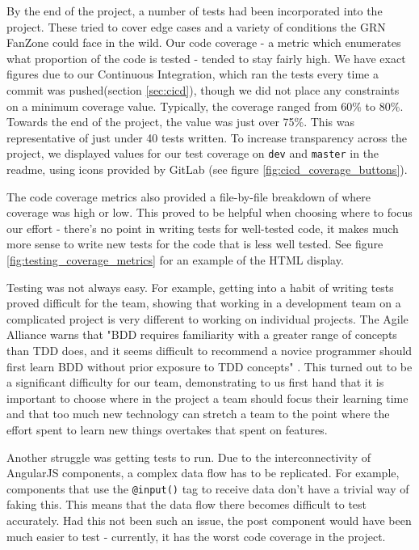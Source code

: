 \documentclass{l3proj}
\begin{document}
By the end of the project, a number of tests had been incorporated into the
 project. These tried to cover edge cases and a variety of conditions the GRN FanZone
 could face in the wild. Our code coverage - a metric which enumerates what
 proportion of the code is tested - tended to stay fairly high. We have exact
 figures due to our Continuous Integration, which ran the tests every time a
 commit was pushed(section \ref{sec:cicd}), though we did not place any constraints
 on a minimum coverage value. Typically, the coverage ranged from 60\% to 80\%.
 Towards the end of the project, the value was just over 75\%. This was
 representative of just under 40 tests written. To increase transparency
 across the project, we displayed values for our test coverage on \texttt{dev} and
 \texttt{master} in the readme, using icons provided by GitLab (see figure
 \ref{fig:cicd_coverage_buttons}).

 The code coverage metrics also provided a file-by-file breakdown of where
 coverage was high or low. This proved to be helpful when choosing
 where to focus our effort - there's no point in writing tests for
 well-tested code, it makes much more sense to write new tests for the
 code that is less well tested. See figure \ref{fig:testing_coverage_metrics}
 for an example of the HTML display.
 
Testing was not always easy. For example, getting into a habit of writing tests
 proved difficult for the team, showing that working in a development team on a
 complicated project is very different to working on individual projects. The
 Agile Alliance warns that "BDD requires familiarity with a greater range of
 concepts than TDD does, and it seems difficult to recommend a novice programmer
 should first learn BDD without prior exposure to TDD concepts"
 \cite{agilealliance_bdd}. This turned out to be a significant difficulty for
 our team, demonstrating to us first hand that it is important to choose where
 in the project a team should focus their learning time and that too much new technology
 can stretch a team to the point where the effort spent to learn new things
 overtakes that spent on features.



Another struggle was getting tests to run. Due to the interconnectivity of
 AngularJS components, a complex data flow has to be replicated. For example,
 components that use the \texttt{@input()} tag to receive data don't have a
 trivial way of faking this. This means that the data flow there becomes
 difficult to test accurately. Had this not been such an issue, the post
 component would have been much easier to test - currently, it has the worst
 code coverage in the project.
\end{document}
